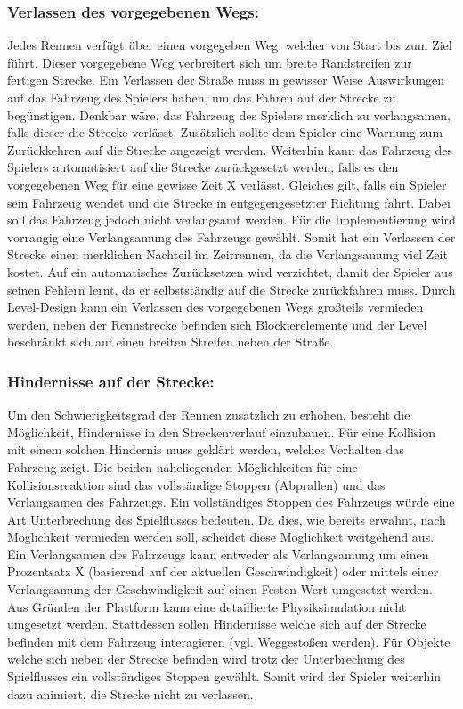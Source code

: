 	\subsubsection*{Verlassen des vorgegebenen Wegs:}\label{par:streckendesign}
		Jedes Rennen verfügt über einen vorgegeben Weg, welcher von Start bis zum Ziel führt. Dieser vorgegebene Weg verbreitert sich um breite Randstreifen zur fertigen Strecke. Ein Verlassen der Straße muss in gewisser Weise Auswirkungen auf das Fahrzeug des Spielers haben, um das Fahren auf der Strecke zu begünstigen. Denkbar wäre, das Fahrzeug des Spielers merklich zu verlangsamen, falls dieser die Strecke verlässt. Zusätzlich sollte dem Spieler eine Warnung zum Zurückkehren auf die Strecke angezeigt werden. Weiterhin kann das Fahrzeug des Spielers automatisiert auf die Strecke zurückgesetzt werden, falls es den vorgegebenen Weg für eine gewisse Zeit X verlässt. Gleiches gilt, falls ein Spieler sein Fahrzeug wendet und die Strecke in entgegengesetzter Richtung fährt. Dabei soll das Fahrzeug jedoch nicht verlangsamt werden. Für die Implementierung wird vorrangig eine Verlangsamung des Fahrzeugs gewählt.
		Somit hat ein Verlassen der Strecke einen merklichen Nachteil im Zeitrennen, da die Verlangsamung viel Zeit kostet. Auf ein automatisches Zurücksetzen wird verzichtet, damit der Spieler aus seinen Fehlern lernt, da er selbstständig auf die Strecke zurückfahren muss. Durch Level-Design kann ein Verlassen des vorgegebenen Wegs großteils vermieden werden, neben der Rennstrecke befinden sich Blockierelemente und der Level beschränkt sich auf einen breiten Streifen neben der Straße.

	\subsubsection*{Hindernisse auf der Strecke:}\label{par:streckendesign2}
		Um den Schwierigkeitsgrad der Rennen zusätzlich zu erhöhen, besteht die Möglichkeit, Hindernisse in den Streckenverlauf einzubauen. Für eine Kollision mit einem solchen Hindernis muss geklärt werden, welches Verhalten das Fahrzeug zeigt. Die beiden naheliegenden Möglichkeiten für eine Kollisionsreaktion sind das vollständige Stoppen (Abprallen) und das Verlangsamen des Fahrzeugs.
		Ein vollständiges Stoppen des Fahrzeugs würde eine Art Unterbrechung des Spielflusses bedeuten. Da dies, wie bereits erwähnt, nach Möglichkeit vermieden werden soll, scheidet diese Möglichkeit weitgehend aus. Ein Verlangsamen des Fahrzeugs kann entweder als Verlangsamung um einen Prozentsatz X (basierend auf der aktuellen Geschwindigkeit) oder mittels einer Verlangsamung der Geschwindigkeit auf einen Festen Wert umgesetzt werden.
		Aus Gründen der Plattform kann eine detaillierte Physiksimulation nicht umgesetzt werden. Stattdessen sollen Hindernisse welche sich auf der Strecke befinden mit dem Fahrzeug interagieren (vgl. Weggestoßen werden). Für Objekte welche sich neben der Strecke befinden wird trotz der Unterbrechung des Spielflusses ein vollständiges Stoppen gewählt. Somit wird der Spieler weiterhin dazu animiert, die Strecke nicht zu verlassen.

